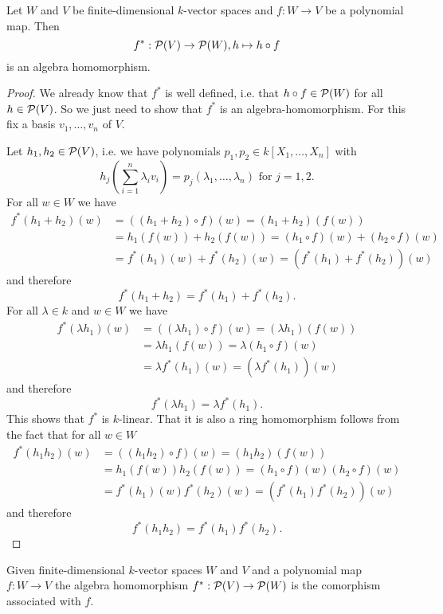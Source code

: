 \begin{lem}
 Let $W$ and $V$ be finite-dimensional $k$-vector spaces and $f : W \to V$ be a polynomial map. Then
 \[
  f^* : \mathcal{P}(V) \to \mathcal{P}(W), h \mapsto h \circ f
 \]
 is an algebra homomorphism.
\end{lem}
\begin{proof}
 We already know that $f^*$ is well defined, i.e. that $h \circ f \in \mathcal{P}(W)$ for all $h \in \mathcal{P}(V)$. So we just need to show that $f^*$ is an algebra-homomorphism. For this fix a basis $v_1, \ldots, v_n$ of $V$.
 
 Let $h_1, h_2\in \mathcal{P}(V)$, i.e. we have polynomials $p_1, p_2\in k[X_1, \ldots, X_n]$ with
 \[
  h_j\left(\sum_{i=1}^n \lambda_i v_i\right) = p_j(\lambda_1, \ldots, \lambda_n) \text{ for } j=1,2.
 \]
 For all $w \in W$ we have
 \begin{align*}
  f^*(h_1+h_2)(w)
  &= ((h_1 + h_2) \circ f)(w)
  = (h_1 + h_2)(f(w)) \\
  &= h_1(f(w)) + h_2(f(w))
  = (h_1 \circ f)(w) + (h_2 \circ f)(w) \\
  &= f^*(h_1)(w) + f^*(h_2)(w)
  = (f^*(h_1)+f^*(h_2))(w)
 \end{align*}
 and therefore
 \[
  f^*(h_1+h_2) = f^*(h_1) + f^*(h_2).
 \]
 For all $\lambda \in k$ and $w \in W$ we have
 \begin{align*}
  f^*(\lambda h_1)(w)
  &= ((\lambda h_1) \circ f)(w)
  = (\lambda h_1)(f(w)) \\
  &= \lambda h_1(f(w))
  = \lambda (h_1 \circ f)(w) \\
  &= \lambda f^*(h_1)(w)
  = (\lambda f^*(h_1))(w)
 \end{align*}
 and therefore
 \[
  f^*(\lambda h_1) = \lambda f^*(h_1).
 \]
 This shows that $f^*$ is $k$-linear. That it is also a ring homomorphism follows from the fact that for all $w \in W$
 \begin{align*}
  f^*(h_1 h_2)(w)
  &= ((h_1 h_2) \circ f)(w)
  = (h_1 h_2)(f(w)) \\
  &= h_1(f(w)) h_2(f(w))
  = (h_1 \circ f)(w) (h_2 \circ f)(w) \\
  &= f^*(h_1)(w) f^*(h_2)(w)
  = (f^*(h_1) f^*(h_2))(w)
 \end{align*}
 and therefore
 \[
  f^*(h_1 h_2) = f^*(h_1) f^*(h_2).
 \]
\end{proof}


\begin{defi}
 Given finite-dimensional $k$-vector spaces $W$ and $V$ and a polynomial map $f : W \to V$ the algebra homomorphism $f^* : \mathcal{P}(V) \to \mathcal{P}(W)$ is the comorphism associated with $f$.
\end{defi}
 

